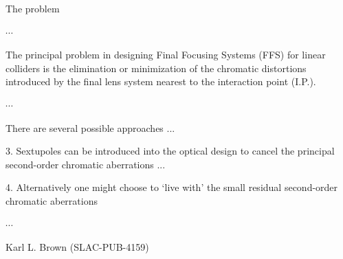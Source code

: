 \documentclass{beamer}
\begin{document}
\begin{frame}{The problem}
\begin{tcolorbox}[colback=green!5,colframe=green!40!black,title=A Conceptual Design of Final Focus Systems for Linear Colliders]
$\cdots$\par
 The principal problem in designing Final Focusing Systems (FFS) for linear colliders is the elimination or minimization of the chromatic distortions introduced by the final lens system nearest to the interaction point (I.P.).\par
 $\cdots$\par
 There are several possible approaches ...\par
 3. Sextupoles can be introduced into the optical design to cancel the principal second-order chromatic aberrations ...\par
 4. Alternatively one might choose to `live with' the small residual second-order chromatic aberrations\par
 $\cdots$\par
\end{tcolorbox}
Karl L. Brown (SLAC-PUB-4159)
\end{frame}
\end{document}
